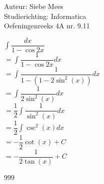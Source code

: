 \documentclass[a4paper]{article}
\begin{document}
  
\noindent \large Auteur: Siebe Mees \\
\noindent \large Studierichting: Informatica\\
\noindent \large Oefeningenreeks 4A nr. 9.11\\

\medskip

\normalsize

$\displaystyle\int \dfrac{dx}{1-\cos2x} $\\

$ = \displaystyle\int \dfrac{1}{1-\cos2x} dx$\\

$ = \displaystyle\int \dfrac{1}{1-(1-2\sin^2(x))} dx$\\

$ = \displaystyle\int \dfrac{1}{2\sin^2(x)} dx$\\

$ = \dfrac{1}{2} \displaystyle\int \dfrac{1}{\sin^2(x)} dx$\\

$ = \dfrac{1}{2} \displaystyle\int \csc^2(x) dx$\\

$ = -\dfrac{1}{2} \cot(x) + C $\\

$ = -\dfrac{1}{2\tan(x)}+ C$\\

\begin{thebibliography}{999}
\end{thebibliography}
\end{document}
